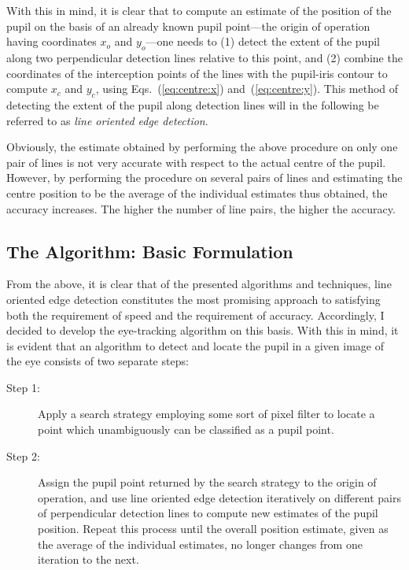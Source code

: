 With this in mind, it is clear that to compute an estimate of the
position of the pupil on the basis of an already known pupil
point---the origin of operation having coordinates $x_{o}$ and
$y_{o}$---one needs to (1) detect the extent of the pupil along two
perpendicular detection lines relative to this point, and (2) combine
the coordinates of the interception points of the lines with the
pupil-iris contour to compute $x_{c}$ and $y_{c}$, using
Eqs.~(\ref{eq:centre:x}) and~(\ref{eq:centre:y}).  This method of
detecting the extent of the pupil along detection lines will in the
following be referred to as {\em line oriented edge detection\/}.

Obviously, the estimate obtained by performing the above procedure on
only one pair of lines is not very accurate with respect to the actual
centre of the pupil.  However, by performing the procedure on several
pairs of lines and estimating the centre position to be the average of
the individual estimates thus obtained, the accuracy increases.  The
higher the number of line pairs, the higher the accuracy.

\subsection{The Algorithm: Basic Formulation}
\label{eval:approach:algo}

From the above, it is clear that of the presented algorithms and
techniques, line oriented edge detection constitutes the most
promising approach to satisfying both the requirement of speed and the
requirement of accuracy.  Accordingly, I decided to develop the
eye-tracking algorithm on this basis.  With this in mind, it is
evident that an algorithm to detect and locate the pupil in a given
image of the eye consists of two separate steps:

\begin{description}
\item[Step 1:] Apply a search strategy employing some sort of pixel
  filter to locate a point which unambiguously can be classified as a
  pupil point.
\item[Step 2:] Assign the pupil point returned by the search strategy
  to the origin of operation, and use line oriented edge detection
  iteratively on different pairs of perpendicular detection lines to
  compute new estimates of the pupil position.  Repeat this process
  until the overall position estimate, given as the average of the
  individual estimates, no longer changes from one iteration to the
  next.
\end{description}

